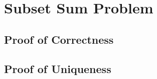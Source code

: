 
\section{Subset Sum Problem}
\label{appx:SSP}
\subsection{Proof of Correctness}
\subsection{Proof of Uniqueness }
